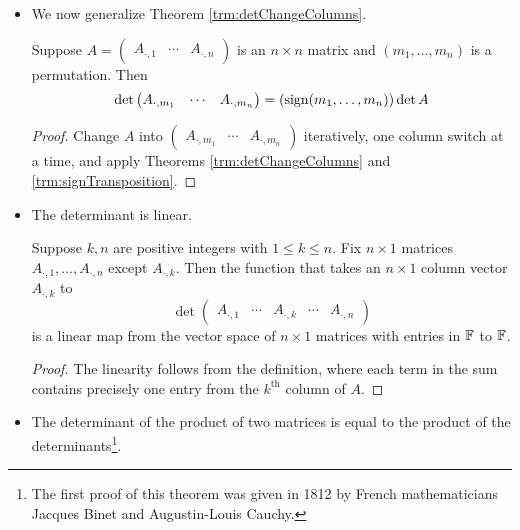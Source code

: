 \documentclass[../main.tex]{subfiles}
\begin{document}
\begin{itemize}
    \item We now generalize Theorem \ref{trm:detChangeColumns}.
    \begin{theorem}
        Suppose $
            A =
            \begin{pmatrix}
                A_{\cdot,1} & \cdots & A_{\cdot,n}
            \end{pmatrix}
        $ is an $n\times n$ matrix and $(m_1,\dots,m_n)$ is a permutation. Then
        \begin{equation*}
            \det
            \begin{pmatrix}
                A_{\cdot,m_1} & \cdots & A_{\cdot,m_n}
            \end{pmatrix}
            = (\operatorname{sign}(m_1,\dots,m_n))\det A
        \end{equation*}
        \begin{proof}
            Change $A$ into $
                \begin{pmatrix}
                    A_{\cdot,m_1} & \cdots & A_{\cdot,m_n}
                \end{pmatrix}
            $ iteratively, one column switch at a time, and apply Theorems \ref{trm:detChangeColumns} and \ref{trm:signTransposition}.
        \end{proof}
    \end{theorem}
    \item The determinant is linear.
    \begin{theorem}
        Suppose $k,n$ are positive integers with $1\leq k\leq n$. Fix $n\times 1$ matrices $A_{\cdot,1},\dots,A_{\cdot,n}$ except $A_{\cdot,k}$. Then the function that takes an $n\times 1$ column vector $A_{\cdot,k}$ to
        \begin{equation*}
            \det
            \begin{pmatrix}
                A_{\cdot,1} & \cdots & A_{\cdot,k} & \cdots & A_{\cdot,n}
            \end{pmatrix}
        \end{equation*}
        is a linear map from the vector space of $n\times 1$ matrices with entries in $\mathbb{F}$ to $\mathbb{F}$.
        \begin{proof}
            The linearity follows from the definition, where each term in the sum contains precisely one entry from the $k^\text{th}$ column of $A$.
        \end{proof}
    \end{theorem}
    \item The determinant of the product of two matrices is equal to the product of the determinants\footnote{The first proof of this theorem was given in 1812 by French mathematicians Jacques Binet and Augustin-Louis Cauchy.}.

\end{itemize}
\end{document}
